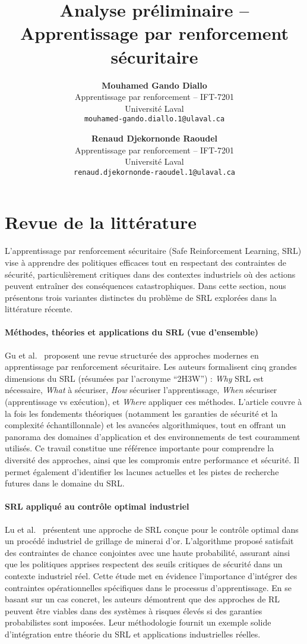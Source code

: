 \documentclass{article}
\title{Analyse préliminaire -- Apprentissage par renforcement sécuritaire}
\author{
  \textbf{Mouhamed Gando Diallo} \\
  Apprentissage par renforcement -- IFT-7201\\
  Université Laval \\
  \texttt{mouhamed-gando.diallo.1@ulaval.ca}
  \and
  \textbf{Renaud Djekornonde Raoudel} \\
  Apprentissage par renforcement -- IFT-7201\\
  Université Laval \\
  \texttt{renaud.djekornonde-raoudel.1@ulaval.ca}
}
\begin{document}
\maketitle

\section*{Revue de la littérature}

L’apprentissage par renforcement sécuritaire (Safe Reinforcement Learning, SRL) vise à apprendre des politiques efficaces tout en respectant des contraintes de sécurité, particulièrement critiques dans des contextes industriels où des actions peuvent entraîner des conséquences catastrophiques. Dans cette section, nous présentons trois variantes distinctes du problème de SRL explorées dans la littérature récente.

\paragraph{Méthodes, théories et applications du SRL (vue d’ensemble)}
Gu et al.~\cite{gu2022review} proposent une revue structurée des approches modernes en apprentissage par renforcement sécuritaire. Les auteurs formalisent cinq grandes dimensions du SRL (résumées par l’acronyme ``2H3W'') : \textit{Why} SRL est nécessaire, \textit{What} à sécuriser, \textit{How} sécuriser l’apprentissage, \textit{When} sécuriser (apprentissage vs exécution), et \textit{Where} appliquer ces méthodes. L’article couvre à la fois les fondements théoriques (notamment les garanties de sécurité et la complexité échantillonnale) et les avancées algorithmiques, tout en offrant un panorama des domaines d’application et des environnements de test couramment utilisés. Ce travail constitue une référence importante pour comprendre la diversité des approches, ainsi que les compromis entre performance et sécurité. Il permet également d’identifier les lacunes actuelles et les pistes de recherche futures dans le domaine du SRL.

\paragraph{SRL appliqué au contrôle optimal industriel}
Lu et al.~\cite{lu2023industrial} présentent une approche de SRL conçue pour le contrôle optimal dans un procédé industriel de grillage de minerai d’or. L’algorithme proposé satisfait des contraintes de chance conjointes avec une haute probabilité, assurant ainsi que les politiques apprises respectent des seuils critiques de sécurité dans un contexte industriel réel. Cette étude met en évidence l'importance d'intégrer des contraintes opérationnelles spécifiques dans le processus d'apprentissage. En se basant sur un cas concret, les auteurs démontrent que des approches de RL peuvent être viables dans des systèmes à risques élevés si des garanties probabilistes sont imposées. Leur méthodologie fournit un exemple solide d'intégration entre théorie du SRL et applications industrielles réelles.
\end{document}
